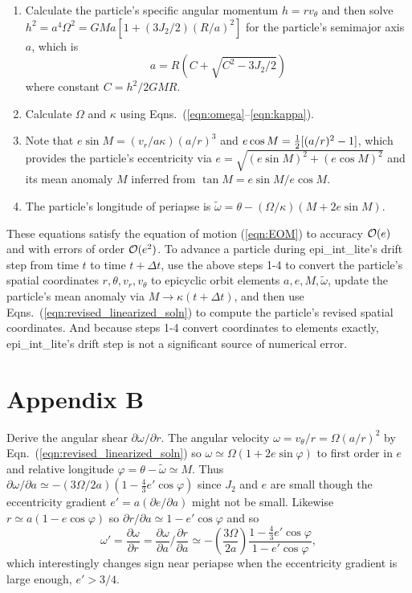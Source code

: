 \documentclass[preprint]{aastex62}
\begin{document}
\begin{enumerate}

\item Calculate the particle's specific angular momentum $h=r v_\theta$ and then solve 
$h^2 = a^4\Omega^2 = GMa[1 + (3J_2/2)(R/a)^2]$
for the particle's semimajor axis $a$, which is
\begin{equation}
    \label{eqn:a}
    a = R\left(C + \sqrt{C^2 - 3J_2/2}\right)
\end{equation}
where constant $C=h^2/2GMR$.

\item Calculate $\Omega$ and $\kappa$ using Eqns.\ (\ref{eqn:omega}--\ref{eqn:kappa}).

\item Note that $e\sin M = (v_r/a\kappa)(a/r)^3$ and $e\cos M = \mbox{$\frac{1}{2}$}[(a/r)^2 - 1]$, which 
provides the particle's eccentricity via $e = \sqrt{(e\sin M)^2 + (e\cos M)^2}$
and its mean anomaly $M$ inferred from $\tan M = e\sin M/e\cos M$.

\item The particle's longitude of periapse is 
$\tilde{\omega} = \theta - (\Omega/\kappa)(M + 2e\sin M)$.

\end{enumerate}
These equations satisfy the equation of motion (\ref{eqn:EOM}) to accuracy ${\cal O}(e)$ and
with errors of order ${\cal O}(e^2)$. To advance a particle during epi\_int\_lite's drift step from 
time $t$ to time $t + \Delta t$, use the above steps 1-4 to convert the particle's spatial
coordinates $r, \theta, v_r, v_\theta$ to epicyclic orbit elements $a,e,M,\tilde{\omega}$,
update the particle's mean anomaly via $M\rightarrow\kappa(t + \Delta t)$, and then use
Eqns.\ (\ref{eqn:revised_linearized_soln}) to compute the particle's revised spatial coordinates.
And because steps 1-4 convert coordinates to elements exactly, epi\_int\_lite's drift step 
is not a significant source of numerical error.

\section{Appendix B}
\label{sec:Appendix B}

Derive the angular shear $\partial\omega/\partial r$.
The angular velocity $\omega=v_\theta/r=\Omega(a/r)^2$ by Eqn.\ (\ref{eqn:revised_linearized_soln}) so
$\omega \simeq\Omega(1+2e\sin\varphi)$
to first order in $e$ and relative longitude $\varphi=\theta -\tilde{\omega}\simeq M$.
Thus $\partial\omega/\partial a \simeq -(3\Omega/2a)(1-\frac{4}{3}e'\cos\varphi)$
since $J_2$ and $e$ are small though
the eccentricity gradient $e'=a(\partial e/\partial a)$ might not be small. Likewise
$r\simeq a(1-e\cos\varphi)$ so $\partial r/\partial a\simeq 1-e'\cos\varphi$ and so
\begin{equation}
    \label{eqn:domega-dr}
    \omega' = \frac{\partial\omega}{\partial r} = 
        \frac{\partial\omega}{\partial a}/\frac{\partial r}{\partial a}
        \simeq -\left(\frac{3\Omega}{2a}\right) \frac{1-\frac{4}{3}e'\cos \varphi}{1-e'\cos \varphi},
\end{equation}
which interestingly changes sign near periapse when the eccentricity gradient is large enough, $e'>3/4$.
\end{document}
